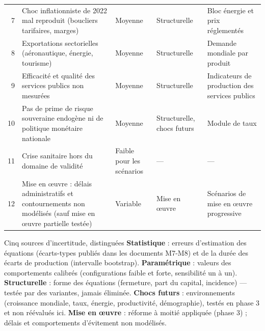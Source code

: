\begin{table}[htbp]
\begin{tabularx}{\linewidth}{@{}rL l l L@{}}
7 & Choc inflationniste de 2022 mal reproduit (boucliers tarifaires, marges) & Moyenne & Structurelle & Bloc énergie et prix réglementés\\
8 & Exportations sectorielles (aéronautique, énergie, tourisme) & Moyenne & Structurelle & Demande mondiale par produit\\
9 & Efficacité et qualité des services publics non mesurées & Moyenne & Structurelle & Indicateurs de production des services publics\\
10 & Pas de prime de risque souveraine endogène ni de politique monétaire nationale & Moyenne & Structurelle, chocs futurs & Module de taux\\
11 & Crise sanitaire hors du domaine de validité & Faible pour les scénarios & — & —\\
12 & Mise en œuvre : délais administratifs et contournements non modélisés (sauf mise en œuvre partielle testée) & Variable & Mise en œuvre & Scénarios de mise en œuvre progressive\\ \bottomrule
\end{tabularx}
\end{table}

\begin{encadre}{Cinq sources d'incertitude, distinguées}
\textbf{Statistique} : erreurs d'estimation des équations (écarts-types publiés dans les documents M7-M8) et de la durée
des écarts de production (intervalle bootstrap). \textbf{Paramétrique} : valeurs des comportements calibrés
(configurations faible et forte, sensibilité un à un). \textbf{Structurelle} : forme des équations (fermeture, part du
capital, incidence) — testée par des variantes, jamais éliminée. \textbf{Chocs futurs} : environnements (croissance
mondiale, taux, énergie, productivité, démographie), testés en phase 3 et non réévalués ici. \textbf{Mise en œuvre} :
réforme à moitié appliquée (phase 3) ; délais et comportements d'évitement non modélisés.
\end{encadre}

